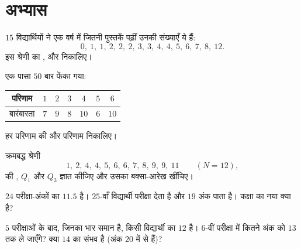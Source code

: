 \section{अभ्यास}

\begin{exercise}[$\star$]\label{exo:g10:stats:1}
$15$ विद्यार्थियों ने एक वर्ष में जितनी पुस्तकें पढ़ीं उनकी संख्याएँ ये
हैं:
\[
0,\ 1,\ 1,\ 2,\ 2,\ 2,\ 3,\ 3,\ 4,\ 4,\ 5,\ 6,\ 7,\ 8,\ 12 .
\]
इस श्रेणी का ,  और  निकालिए।
\end{exercise}

\begin{exercise}[$\star$]\label{exo:g10:stats:2}
एक पासा $50$ बार फेंका गया:
\begin{center}
\renewcommand{\arraystretch}{1.2}
\begin{tabular}{c|cccccc}
परिणाम & $1$ & $2$ & $3$ & $4$ & $5$ & $6$ \\
\hline
बारंबारता & $7$ & $9$ & $8$ & $10$ & $6$ & $10$ \\
\end{tabular}
\end{center}
हर परिणाम की  और  परिणाम निकालिए।
\end{exercise}

\begin{exercise}[$\star$]\label{exo:g10:stats:3}
क्रमबद्ध श्रेणी
\[
1,\ 2,\ 4,\ 4,\ 5,\ 6,\ 6,\ 7,\ 8,\ 9,\ 9,\ 11 \qquad (N = 12),
\]
की , $Q_1$ और $Q_3$ ज्ञात कीजिए और उसका बक्सा-आरेख खींचिए।
\end{exercise}

\begin{exercise}[$\star$]\label{exo:g10:stats:4}
$24$ परीक्षा-अंकों का  $11.5$ है। $25$-वाँ विद्यार्थी परीक्षा देता है
और $19$ अंक पाता है। कक्षा का नया  क्या है?
\end{exercise}

\begin{exercise}[$\star\star$]\label{exo:g10:stats:5}
$5$ परीक्षाओं के बाद, जिनका भार समान है, किसी विद्यार्थी का  $12$
है। $6$-वीं परीक्षा में कितने अंक  को $13$ तक ले जाएँगे? क्या $14$
का  संभव है (अंक $20$ में से हैं)?
\end{exercise}

